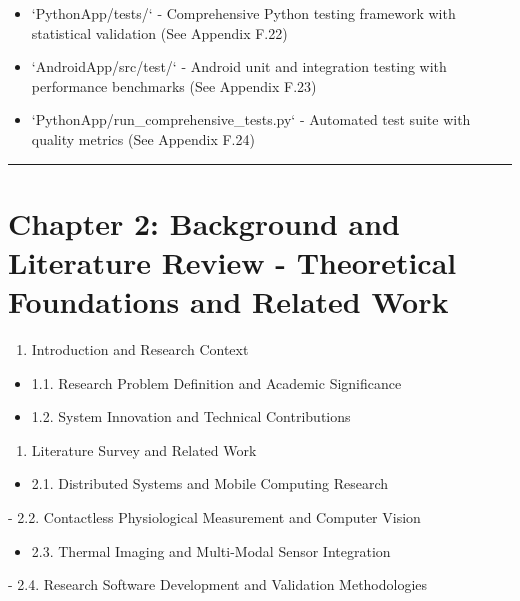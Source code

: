 \documentclass[12pt,a4paper]{report}
\begin{document}
\begin{itemize}
\item `PythonApp/tests/` - Comprehensive Python testing framework with statistical validation (See Appendix F.22)
\item `AndroidApp/src/test/` - Android unit and integration testing with performance benchmarks (See Appendix F.23)
\item `PythonApp/run_comprehensive_tests.py` - Automated test suite with quality metrics (See Appendix F.24)

\end{itemize}
\hrule

\section{Chapter 2: Background and Literature Review - Theoretical Foundations and Related Work}

\begin{enumerate}
\item Introduction and Research Context

\end{enumerate}
\begin{itemize}
\item 1.1. Research Problem Definition and Academic Significance
\item 1.2. System Innovation and Technical Contributions

\end{itemize}
\begin{enumerate}
\item Literature Survey and Related Work

\end{enumerate}
\begin{itemize}
\item 2.1. Distributed Systems and Mobile Computing Research
\end{itemize}
-
2.2. Contactless Physiological Measurement and Computer Vision
\begin{itemize}
\item 2.3. Thermal Imaging and Multi-Modal Sensor Integration
\end{itemize}
-
2.4. Research Software Development and Validation Methodologies
\end{document}
